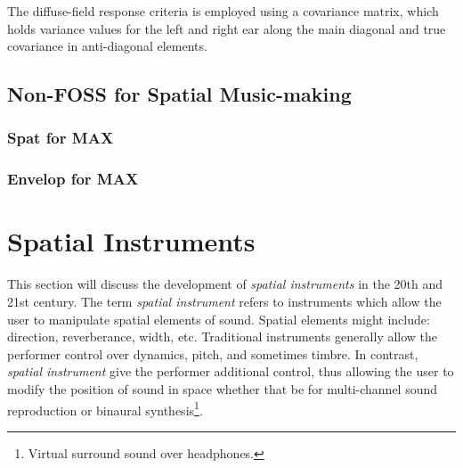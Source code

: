 The diffuse-field response criteria is employed using a covariance matrix, which holds variance values for the left and right ear along the main diagonal and true covariance in anti-diagonal elements.




\subsection{Non-FOSS for Spatial Music-making}

\subsubsection{Spat for MAX}


\subsubsection{Envelop for MAX}

    



\section{Spatial Instruments}

This section will discuss the development of \textit{spatial instruments} in the 20th and 21st century. The term \textit{spatial instrument} refers to instruments which allow the user to manipulate spatial elements of sound. Spatial elements might include: direction, reverberance, width, etc. Traditional instruments generally allow the performer control over dynamics, pitch, and sometimes timbre. In contrast, \textit{spatial instrument} give the performer additional control, thus allowing the user to modify the position of sound in space whether that be for multi-channel sound reproduction or binaural synthesis\footnote{Virtual surround sound over headphones.}. 

